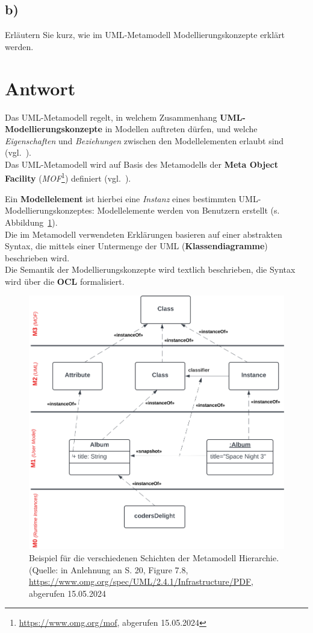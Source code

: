 \subsection*{b)}
Erläutern Sie kurz, wie im UML‐Metamodell Modellierungskonzepte erklärt werden.


\section*{Antwort}
Das UML-Metamodell regelt, in welchem Zusammenhang \textbf{UML-Modellierungskonzepte} in Modellen auftreten dürfen, und welche \textit{Eigenschaften} und \textit{Beziehungen} zwischen den Modellelementen erlaubt sind (vgl.~\cite[81]{Buh09}).\\
Das UML-Metamodell wird auf Basis des Metamodells der \textbf{Meta Object Facility} (\textit{MOF}\footnote{
\url{https://www.omg.org/mof}, abgerufen 15.05.2024
}) definiert (vgl.~\cite[5]{Buh09}).

\noindent
Ein \textbf{Modellelement} ist hierbei eine \textit{Instanz} eines bestimmten UML-Modellierungskonzeptes: Modellelemente werden von Benutzern erstellt (s. Abbildung~\ref{fig:metamodel}).\\

\noindent
Die im Metamodell verwendeten Erklärungen basieren auf einer abstrakten Syntax, die mittels einer Untermenge der UML (\textbf{Klassendiagramme}) beschrieben wird.\\

\noindent
Die Semantik der Modellierungskonzepte wird textlich beschrieben, die Syntax wird über die \textbf{OCL} formalisiert.

\begin{figure}
    \centering
    \includegraphics[scale=0.4]{chapters/aufgabe 1/img/metamodel}
    \caption{Beispiel für die verschiedenen Schichten der Metamodell Hierarchie. (Quelle: in Anlehnung an S. 20, Figure 7.8, \url{https://www.omg.org/spec/UML/2.4.1/Infrastructure/PDF}, abgerufen 15.05.2024}
    \label{fig:metamodel}
\end{figure}